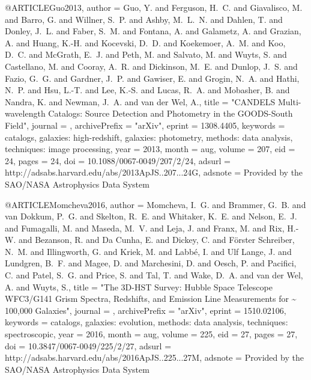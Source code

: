 \documentclass{aa}
\begin{document}
{{{{@ARTICLE{Guo2013,
   author = {{Guo}, Y. and {Ferguson}, H.~C. and {Giavalisco}, M. and {Barro}, G. and 
	{Willner}, S.~P. and {Ashby}, M.~L.~N. and {Dahlen}, T. and 
	{Donley}, J.~L. and {Faber}, S.~M. and {Fontana}, A. and {Galametz}, A. and 
	{Grazian}, A. and {Huang}, K.-H. and {Kocevski}, D.~D. and {Koekemoer}, A.~M. and 
	{Koo}, D.~C. and {McGrath}, E.~J. and {Peth}, M. and {Salvato}, M. and 
	{Wuyts}, S. and {Castellano}, M. and {Cooray}, A.~R. and {Dickinson}, M.~E. and 
	{Dunlop}, J.~S. and {Fazio}, G.~G. and {Gardner}, J.~P. and 
	{Gawiser}, E. and {Grogin}, N.~A. and {Hathi}, N.~P. and {Hsu}, L.-T. and 
	{Lee}, K.-S. and {Lucas}, R.~A. and {Mobasher}, B. and {Nandra}, K. and 
	{Newman}, J.~A. and {van der Wel}, A.},
    title = "{CANDELS Multi-wavelength Catalogs: Source Detection and Photometry in the GOODS-South Field}",
  journal = {\apjs},
archivePrefix = "arXiv",
   eprint = {1308.4405},
 keywords = {catalogs, galaxies: high-redshift, galaxies: photometry, methods: data analysis, techniques: image processing},
     year = 2013,
    month = aug,
   volume = 207,
      eid = {24},
    pages = {24},
      doi = {10.1088/0067-0049/207/2/24},
   adsurl = {http://adsabs.harvard.edu/abs/2013ApJS..207...24G},
  adsnote = {Provided by the SAO/NASA Astrophysics Data System}
}

@ARTICLE{Momcheva2016,
   author = {{Momcheva}, I.~G. and {Brammer}, G.~B. and {van Dokkum}, P.~G. and 
	{Skelton}, R.~E. and {Whitaker}, K.~E. and {Nelson}, E.~J. and 
	{Fumagalli}, M. and {Maseda}, M.~V. and {Leja}, J. and {Franx}, M. and 
	{Rix}, H.-W. and {Bezanson}, R. and {Da Cunha}, E. and {Dickey}, C. and 
	{F{\"o}rster Schreiber}, N.~M. and {Illingworth}, G. and {Kriek}, M. and 
	{Labb{\'e}}, I. and {Ulf Lange}, J. and {Lundgren}, B.~F. and 
	{Magee}, D. and {Marchesini}, D. and {Oesch}, P. and {Pacifici}, C. and 
	{Patel}, S.~G. and {Price}, S. and {Tal}, T. and {Wake}, D.~A. and 
	{van der Wel}, A. and {Wuyts}, S.},
    title = "{The 3D-HST Survey: Hubble Space Telescope WFC3/G141 Grism Spectra, Redshifts, and Emission Line Measurements for \~{} 100,000 Galaxies}",
  journal = {\apjs},
archivePrefix = "arXiv",
   eprint = {1510.02106},
 keywords = {catalogs, galaxies: evolution, methods: data analysis, techniques: spectroscopic},
     year = 2016,
    month = aug,
   volume = 225,
      eid = {27},
    pages = {27},
      doi = {10.3847/0067-0049/225/2/27},
   adsurl = {http://adsabs.harvard.edu/abs/2016ApJS..225...27M},
  adsnote = {Provided by the SAO/NASA Astrophysics Data System}
}

}}}}
\end{document}
